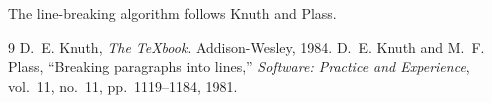 \documentclass[10pt,twocolumn]{article}
\begin{document}
\pagestyle{empty}

The line-breaking algorithm follows Knuth and Plass.

\begin{thebibliography}{9}
 D.~E. Knuth, \emph{The \TeX book}. Addison-Wesley, 1984.
 D.~E. Knuth and M.~F. Plass, ``Breaking paragraphs into
  lines,'' \emph{Software: Practice and Experience}, vol.~11, no.~11,
  pp.~1119--1184, 1981.
\end{thebibliography}
\end{document}
